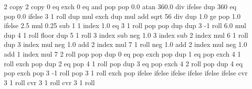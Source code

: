 \documentclass{article}
\begin{document}
{\pgfpoint{-2cm}{-2cm}}
{\pgfpoint{2cm}{2cm}}
{}
{ %
 2 copy %
 2 copy 0 eq exch 0 eq and
 { pop pop 0.0 } %
 {atan 360.0 div} %
 ifelse  %
 dup 360 eq { pop 0.0 }{} ifelse %
 3 1 roll %
 dup mul %
 exch dup mul %
 add sqrt %
 56 div %
 dup 1.0 ge %
 { pop 1.0 }{} ifelse %
 2.5 mul 0.25 sub %
 1 %
 1 index 1.0 eq %
 { %
   3 1 roll pop pop dup dup
 }
 { %
   3 -1 roll 6.0 mul dup 4 1 roll %
   floor %
   dup  5 1 roll %
   3 index sub neg %
   1.0 3 index sub %
   2 index mul %
   6 1 roll %
   dup 3 index mul neg 1.0 add %
   2 index mul %
   7 1 roll %
   neg 1.0 add %
   2 index mul neg 1.0  add %
   1 index mul %
   7 2 roll %
   pop pop %
   dup 0 eq %
   { %
   pop exch pop
   }
   { dup 1 eq %
     { %
   pop exch 4 1 roll exch pop
     }
     { dup 2 eq %
       { %
       pop 4 1 roll pop
       }
       { dup 3 eq %
         { %
         pop exch 4 2 roll pop
         }
         { dup 4 eq %
           { %
           pop exch pop 3 -1 roll
           }
           { %
           pop 3 1 roll exch pop
           }
           ifelse
         }
         ifelse %
       }
       ifelse %
     }
     ifelse %
   }
   ifelse %
 }
 ifelse %
 cvr 3 1 roll cvr 3 1 roll cvr 3 1 roll 
}
\end{document}
